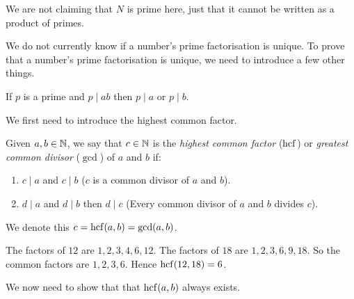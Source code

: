 \documentclass[../main.tex]{subfiles}
\begin{document}
\begin{remark}[Note]
  We are not claiming that $N$ is prime here, just that it cannot be written as a product of primes.
\end{remark}
We do not currently know if a number's prime factorisation is unique.
To prove that a number's prime factorisation is unique, we need to introduce a few other things.
\begin{proposition}
  If $p$ is a prime and $p \mid ab$ then $p \mid a$ or $p \mid b$.
\end{proposition}
We first need to introduce the highest common factor.
\begin{definition}
  Given $a, b \in \mathbb{N}$, we say that $c \in \mathbb{N}$ is the \textit{highest common factor} ($\operatorname{hcf}$) or \textit{greatest common divisor} ($\gcd$) of $a$ and $b$ if:
  \begin{enumerate}
    \item $c \mid a$ and $c \mid b$ ($c$ is a common divisor of $a$ and $b$).
    \item $d \mid a$ and $d \mid b$ then $d \mid c$ (Every common divisor of $a$ and $b$ divides $c$).
  \end{enumerate}
  We denote this $c = \operatorname{hcf}(a, b) = \gcd(a, b)$.
\end{definition}
\begin{example}
  The factors of $12$ are $1, 2, 3, 4, 6, 12$. The factors of $18$ are $1, 2, 3, 6, 9, 18$.
  So the common factors are $1, 2, 3, 6$.
  Hence $\operatorname{hcf}(12, 18) = 6$.
\end{example}
We now need to show that that $\operatorname{hcf}(a, b)$ always exists.
\end{document}
